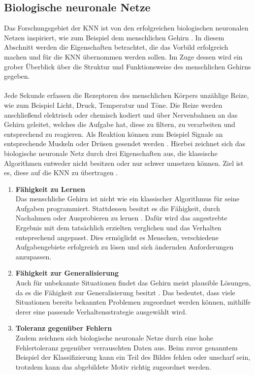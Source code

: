 \subsection{Biologische neuronale Netze}
\label{subsec:biological_neuraL_networks}
Das Forschungsgebiet der \ac{KNN} ist von den erfolgreichen biologischen neuronalen Netzen inspiriert, wie zum Beispiel dem menschlichen Gehirn \cite{kriesel2008kleiner}. In diesem Abschnitt werden die Eigenschaften betrachtet, die das Vorbild erfolgreich machen und für die \ac{KNN} übernommen werden sollen. Im Zuge dessen wird ein grober Überblick über die Struktur und Funktionsweise des menschlichen Gehirns gegeben. 
\\\\
Jede Sekunde erfassen die Rezeptoren des menschlichen Körpers unzählige Reize, wie zum Beispiel Licht, Druck, Temperatur und Töne. Die Reize werden anschließend elektrisch oder chemisch kodiert und über Nervenbahnen an das Gehirn geleitet, welches die Aufgabe hat, diese zu filtern, zu verarbeiten und entsprechend zu reagieren. Als Reaktion können zum Beispiel Signale an entsprechende Muskeln oder Drüsen gesendet werden \cite{kinnebrock2018neuronale}. Hierbei zeichnet sich das biologische neuronale Netz durch drei Eigenschaften aus, die klassische Algorithmen entweder nicht besitzen oder nur schwer umsetzen können. Ziel ist es, diese auf die \ac{KNN} zu übertragen \cite{kriesel2008kleiner}.
\begin{enumerate}
	\item \textbf{ Fähigkeit zu Lernen} \\
	Das menschliche Gehirn ist nicht wie ein klassischer Algorithmus für seine Aufgaben programmiert. Stattdessen besitzt es die Fähigkeit, durch Nachahmen oder Ausprobieren zu lernen \cite{kriesel2008kleiner}. Dafür wird das angestrebte Ergebnis mit dem tatsächlich erzielten verglichen und das Verhalten entsprechend angepasst. Dies ermöglicht es Menschen, verschiedene Aufgabengebiete erfolgreich zu lösen und sich ändernden Anforderungen anzupassen.
	
	\item \textbf{Fähigkeit zur Generalisierung}\\
	Auch für unbekannte Situationen findet das Gehirn meist plausible Lösungen, da es die Fähigkeit zur Generalisierung besitzt \cite{kriesel2008kleiner}. Das bedeutet, dass viele Situationen bereits bekannten Problemen zugeordnet werden können, mithilfe derer eine passende Verhaltensstrategie ausgewählt wird. 
	
	\item \textbf{Toleranz gegenüber Fehlern}\\
	Zudem zeichnen sich biologische neuronale Netze durch eine hohe Fehlertoleranz gegenüber verrauschten Daten aus. Beim zuvor genanntem Beispiel der Klassifizierung kann ein Teil des Bildes fehlen oder unscharf sein, trotzdem kann das abgebildete Motiv richtig zugeordnet werden.
\end{enumerate}

